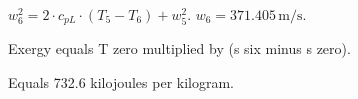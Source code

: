 \( w_6^2 = 2 \cdot c_{pL} \cdot (T_5 - T_6) + w_5^2 \).  
\( w_6 = 371.405 \, \text{m/s} \).

Exergy equals T zero multiplied by (s six minus s zero).  

Equals 732.6 kilojoules per kilogram.